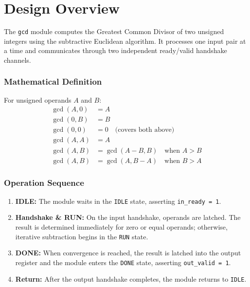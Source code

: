 \chapter{Design Overview} 
\label{cha:design_overview}

The \texttt{gcd} module computes the Greatest Common Divisor of two unsigned integers using the subtractive Euclidean algorithm. It processes one input pair at a time and communicates through two independent ready/valid handshake channels.

\subsection*{Mathematical Definition}
For unsigned operands $A$ and $B$:
\begin{align*}
    \gcd(A, 0) &= A \\
    \gcd(0, B) &= B \\
    \gcd(0, 0) &= 0 \quad \text{(covers both above)} \\
    \gcd(A, A) &= A \\
    \gcd(A, B) &= \gcd(A - B, B) \quad \text{when } A > B \\
    \gcd(A, B) &= \gcd(A, B - A) \quad \text{when } B > A
\end{align*}

\subsection*{Operation Sequence}
\begin{enumerate}
    \item \textbf{IDLE:} The module waits in the \texttt{IDLE} state, asserting \texttt{in\_ready = 1}.
    \item \textbf{Handshake \& RUN:} On the input handshake, operands are latched. The result is determined immediately for zero or equal operands; otherwise, iterative subtraction begins in the \texttt{RUN} state.
    \item \textbf{DONE:} When convergence is reached, the result is latched into the output register and the module enters the \texttt{DONE} state, asserting \texttt{out\_valid = 1}.
    \item \textbf{Return:} After the output handshake completes, the module returns to \texttt{IDLE}.
\end{enumerate}

